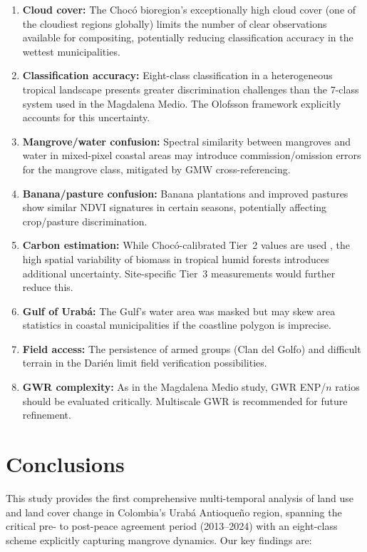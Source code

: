 \documentclass[12pt,a4paper]{article}
\begin{document}
\begin{enumerate}[label=\arabic*.]
\item \textbf{Cloud cover:} The Choc\'{o} bioregion's exceptionally high cloud cover (one of the cloudiest regions globally) limits the number of clear observations available for compositing, potentially reducing classification accuracy in the wettest municipalities.
\item \textbf{Classification accuracy:} Eight-class classification in a heterogeneous tropical landscape presents greater discrimination challenges than the 7-class system used in the Magdalena Medio. The Olofsson framework explicitly accounts for this uncertainty.
\item \textbf{Mangrove/water confusion:} Spectral similarity between mangroves and water in mixed-pixel coastal areas may introduce commission/omission errors for the mangrove class, mitigated by GMW cross-referencing.
\item \textbf{Banana/pasture confusion:} Banana plantations and improved pastures show similar NDVI signatures in certain seasons, potentially affecting crop/pasture discrimination.
\item \textbf{Carbon estimation:} While Choc\'{o}-calibrated Tier~2 values are used \citep{Phillips2019,Alvarez2012}, the high spatial variability of biomass in tropical humid forests introduces additional uncertainty. Site-specific Tier~3 measurements would further reduce this.
\item \textbf{Gulf of Urab\'{a}:} The Gulf's water area was masked but may skew area statistics in coastal municipalities if the coastline polygon is imprecise.
\item \textbf{Field access:} The persistence of armed groups (Clan del Golfo) and difficult terrain in the Dari\'{e}n limit field verification possibilities.
\item \textbf{GWR complexity:} As in the Magdalena Medio study, GWR ENP/$n$ ratios should be evaluated critically. Multiscale GWR \citep{Oshan2019} is recommended for future refinement.
\end{enumerate}


\section{Conclusions}

This study provides the first comprehensive multi-temporal analysis of land use and land cover change in Colombia's Urab\'{a} Antioque\~{n}o region, spanning the critical pre- to post-peace agreement period (2013--2024) with an eight-class scheme explicitly capturing mangrove dynamics. Our key findings are:
\end{document}
